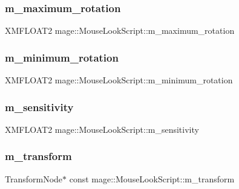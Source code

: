 \subsubsection{\texorpdfstring{m\+\_\+maximum\+\_\+rotation}{m\_maximum\_rotation}}
{\footnotesize\ttfamily X\+M\+F\+L\+O\+A\+T2 mage\+::\+Mouse\+Look\+Script\+::m\+\_\+maximum\+\_\+rotation\hspace{0.3cm}{\ttfamily [private]}}

\hypertarget{classmage_1_1_mouse_look_script_ad09bda241666f60dfc408500cafd073d}{}\label{classmage_1_1_mouse_look_script_ad09bda241666f60dfc408500cafd073d} 
\subsubsection{\texorpdfstring{m\+\_\+minimum\+\_\+rotation}{m\_minimum\_rotation}}
{\footnotesize\ttfamily X\+M\+F\+L\+O\+A\+T2 mage\+::\+Mouse\+Look\+Script\+::m\+\_\+minimum\+\_\+rotation\hspace{0.3cm}{\ttfamily [private]}}

\hypertarget{classmage_1_1_mouse_look_script_a4f38b9bd8e7271503a70753ce6a923c7}{}\label{classmage_1_1_mouse_look_script_a4f38b9bd8e7271503a70753ce6a923c7} 
\subsubsection{\texorpdfstring{m\+\_\+sensitivity}{m\_sensitivity}}
{\footnotesize\ttfamily X\+M\+F\+L\+O\+A\+T2 mage\+::\+Mouse\+Look\+Script\+::m\+\_\+sensitivity\hspace{0.3cm}{\ttfamily [private]}}

\hypertarget{classmage_1_1_mouse_look_script_a419b30350dc3eed30ae2f983812391f5}{}\label{classmage_1_1_mouse_look_script_a419b30350dc3eed30ae2f983812391f5} 
\subsubsection{\texorpdfstring{m\+\_\+transform}{m\_transform}}
{\footnotesize\ttfamily Transform\+Node$\ast$ const mage\+::\+Mouse\+Look\+Script\+::m\+\_\+transform\hspace{0.3cm}{\ttfamily [private]}}

